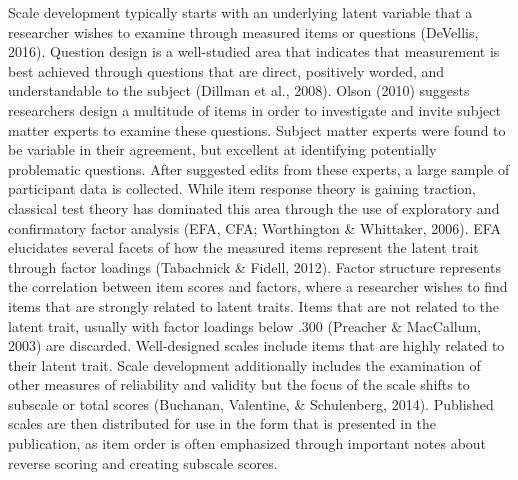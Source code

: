 \documentclass[english,man]{apa6}
\theoremstyle{definition}
\theoremstyle{definition}
\theoremstyle{definition}
\theoremstyle{remark}
\begin{document}
Scale development typically starts with an underlying latent variable
that a researcher wishes to examine through measured items or questions
(DeVellis, 2016). Question design is a well-studied area that indicates
that measurement is best achieved through questions that are direct,
positively worded, and understandable to the subject (Dillman et al.,
2008). Olson (2010) suggests researchers design a multitude of items in
order to investigate and invite subject matter experts to examine these
questions. Subject matter experts were found to be variable in their
agreement, but excellent at identifying potentially problematic
questions. After suggested edits from these experts, a large sample of
participant data is collected. While item response theory is gaining
traction, classical test theory has dominated this area through the use
of exploratory and confirmatory factor analysis (EFA, CFA; Worthington
\& Whittaker, 2006). EFA elucidates several facets of how the measured
items represent the latent trait through factor loadings (Tabachnick \&
Fidell, 2012). Factor structure represents the correlation between item
scores and factors, where a researcher wishes to find items that are
strongly related to latent traits. Items that are not related to the
latent trait, usually with factor loadings below .300 (Preacher \&
MacCallum, 2003) are discarded. Well-designed scales include items that
are highly related to their latent trait. Scale development additionally
includes the examination of other measures of reliability and validity
but the focus of the scale shifts to subscale or total scores (Buchanan,
Valentine, \& Schulenberg, 2014). Published scales are then distributed
for use in the form that is presented in the publication, as item order
is often emphasized through important notes about reverse scoring and
creating subscale scores.
\end{document}
